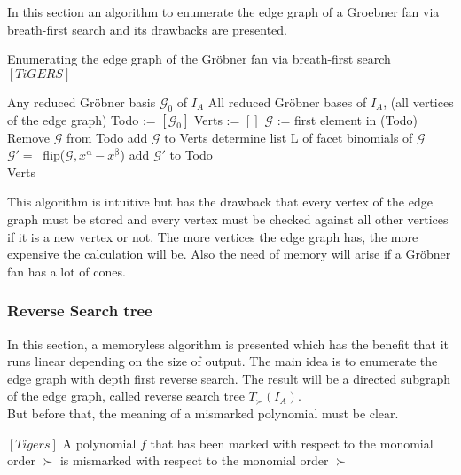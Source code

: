 In this section an algorithm to enumerate the edge graph of a Groebner fan via breath-first search and its drawbacks are presented.

\begin{algorithm}
\caption{Enumerating the edge graph of the Gröbner fan via breath-first search $\left[ TiGERS\right]  $}
\label{breadth-alg}
\begin{algorithmic}[1]

\Require
Any reduced Gröbner basis $ \mathcal{G}_0 $ of $I_A$
\Ensure All reduced Gröbner bases of $I_A$, (all vertices of the edge graph)
\State Todo := $\left[ \mathcal{G}_0 \right]  $
\State Verts := $\left[ \right] $
\State $\mathcal{G}$ := first element in (Todo)
\State Remove $\mathcal{G} $ from Todo
\State add $\mathcal{G}$ to Verts 
\State determine list L of facet binomials of $\mathcal{G} $
 \State $\mathcal{G}' =~$ flip($\mathcal{G},x^{\upalpha} - x^{\upbeta} $)
 \State add $\mathcal{G}'$ to Todo
 \EndIf
 \EndFor
\EndWhile \\
\Return Verts

\end{algorithmic}
\end{algorithm}

This algorithm is intuitive but has the drawback that every vertex of the edge graph must be stored and every vertex must be checked against all other vertices if it is a new vertex or not. 
The more vertices the edge graph has, the more expensive the calculation will be. Also the need of memory will arise if a Gröbner fan has a lot of cones.
 

\subsubsection{Reverse Search tree}
In this section, a memoryless algorithm is presented which has the benefit that it runs linear depending on the size of output. The main idea is to enumerate the edge graph with depth first reverse search. The result will be a directed subgraph of the edge graph, called reverse search tree $T_{\succ}(I_{A}) $.\\
But before that, the meaning of a mismarked polynomial must be clear.
\begin{env_definition}
$\left[Tigers \right]  $
A polynomial $f$ that has been marked with respect to the monomial order $\succ$  is mismarked with respect to the monomial order $\succ$  
\end{env_definition}


